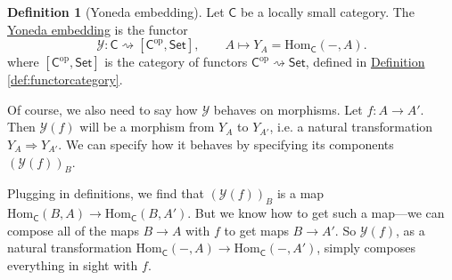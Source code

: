 \documentclass[a4paper]{report}
\newcommand{\defn}[1]{\ul{#1}}
\newcommand{\Hom}{\mathrm{Hom}}
\theoremstyle{definition}
\newtheorem{definition}{Definition}[section]
\theoremstyle{plain}
\theoremstyle{remark}
\begin{document}
\begin{definition}[Yoneda embedding]
  \label{def:yonedaembedding}
  Let $\mathsf{C}$ be a locally small category. The \defn{Yoneda embedding} is the functor
  \begin{equation*}
    \mathcal{Y}\colon \mathsf{C} \rightsquigarrow [\mathsf{C}^{\mathrm{op}}, \mathsf{Set}], \qquad A \mapsto Y_{A} = \Hom_{\mathsf{C}}(-, A).
  \end{equation*}
  where $[\mathsf{C}^{\mathrm{op}}, \mathsf{Set}]$ is the category of functors $\mathsf{C}^{\mathrm{op}} \rightsquigarrow \mathsf{Set}$, defined in \hyperref[def:functorcategory]{Definition \ref*{def:functorcategory}}.

  Of course, we also need to say how $\mathcal{Y}$ behaves on morphisms. Let $f\colon A \to A'$. Then $\mathcal{Y}(f)$ will be a morphism from $Y_{A}$ to $Y_{A'}$, i.e. a natural transformation $Y_{A} \Rightarrow Y_{A'}$. We can specify how it behaves by specifying its components $(\mathcal{Y}(f))_{B}$. 

  Plugging in definitions, we find that $(\mathcal{Y}(f))_{B}$ is a map $\Hom_{\mathsf{C}}(B, A) \to \Hom_{\mathsf{C}}(B, A')$. But we know how to get such a map---we can compose all of the maps $B \to A$ with $f$ to get maps $B \to A'$. So $\mathcal{Y}(f)$, as a natural transformation $\Hom_{\mathsf{C}}(-, A) \to \Hom_{\mathsf{C}}(-, A')$, simply composes everything in sight with $f$.
\end{definition}
\end{document}
